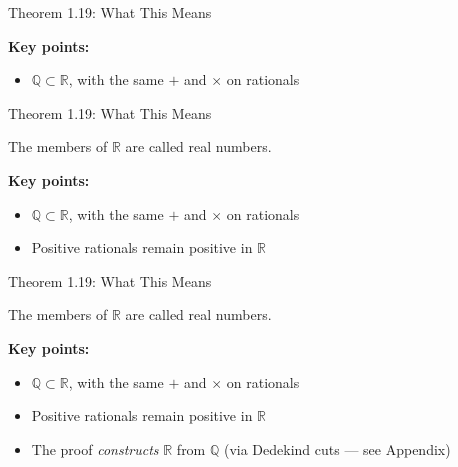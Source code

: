 \documentclass[aspectratio=169,12pt,t]{beamer}
\begin{document}
{\begin{frame}{Theorem 1.19: What This Means}
\begin{hlbox}
    \vspace{1em}
    \textbf{Key points:}
    \begin{itemize}
      \item $\mathbb{Q} \subset \mathbb{R}$, with the same $+$ and $\times$ on rationals
    \end{itemize}
  \end{hlbox}

\end{frame}

\begin{frame}{Theorem 1.19: What This Means}
  \begin{hlbox}
    The members of $\mathbb{R}$ are called \alert{real numbers}.

    \vspace{1em}
    \textbf{Key points:}
    \begin{itemize}
      \item $\mathbb{Q} \subset \mathbb{R}$, with the same $+$ and $\times$ on rationals
      \item Positive rationals remain positive in $\mathbb{R}$
    \end{itemize}
  \end{hlbox}

\end{frame}

\begin{frame}{Theorem 1.19: What This Means}
  \begin{hlbox}
    The members of $\mathbb{R}$ are called \alert{real numbers}.

    \vspace{1em}
    \textbf{Key points:}
    \begin{itemize}
      \item $\mathbb{Q} \subset \mathbb{R}$, with the same $+$ and $\times$ on rationals
      \item Positive rationals remain positive in $\mathbb{R}$
      \item The proof \emph{constructs} $\mathbb{R}$ from $\mathbb{Q}$ (via Dedekind cuts --- see Appendix)
    \end{itemize}
  \end{hlbox}


\end{frame}}
\end{document}
